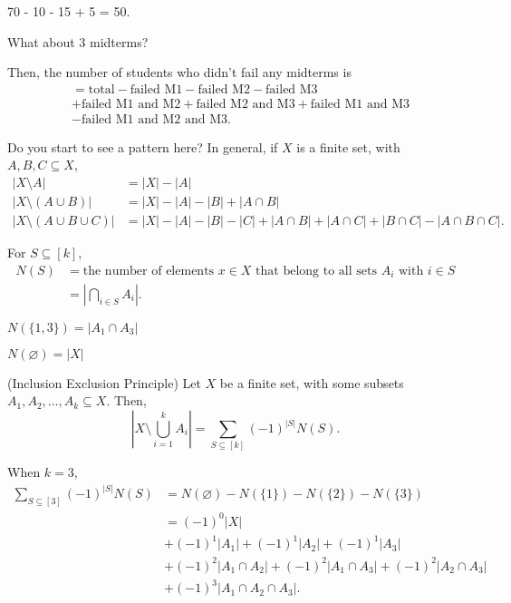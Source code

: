 70 - 10 - 15 + 5 = 50.

\begin{eg}
	What about 3 midterms?
\end{eg}

Then, the number of students who didn't fail any midterms is 
\begin{align*}
	&= \text{total} - \text{failed M1} - \text{failed M2} - \text{failed M3} \\
	&+ \text{failed M1 and M2} + \text{failed M2 and M3} + \text{failed M1 and M3} \\
	&- \text{failed M1 and M2 and M3}
.\end{align*}

Do you start to see a pattern here? In general, if \( X \) is a finite set, with \( A,B,C \subseteq X \),
\begin{align*}
	|X \setminus A| &= |X| - |A| \\
	|X \setminus (A \cup B)| &= |X| - |A| - |B| + |A \cap B| \\
	|X \setminus (A \cup B \cup C)| &= |X| - |A| - |B| - |C|  + |A \cap B| + |A \cap C| + |B \cap C| - |A \cap B \cap C|
.\end{align*}

\begin{notation}
	For \( S \subseteq [k] \), 
	\begin{align*}
		N(S) &= \text{the number of elements } x \in  X \text{ that belong to all sets } A_i \text{ with } i \in S \\
									&= \left| \bigcap_{i \in S} A_{i} \right| 
	.\end{align*}
\end{notation}

\begin{eg}
	\( N(\{1,3\}  ) = |A_{1} \cap A_3|\)
\end{eg}

\begin{eg}
	\( N(\varnothing) = |X| \)
\end{eg}

\begin{theorem}
	(Inclusion Exclusion Principle) Let \( X \) be a finite set, with some subsets \( A_{1},A_{2},\ldots ,A_k \subseteq X \). Then, \[
		\left|X \setminus \bigcup_{i=1}^{k} A_{i}\right| = \sum_{S \subseteq [k] } (-1)^{|S|} N(S)
	.\] 
\end{theorem}

\begin{eg}
	When \( k=3 \),  
	\begin{align*}
		\sum_{S \subseteq [3] } (-1)^{|S|} N(S) &= N(\varnothing) - N(\{1\} ) - N(\{2\} ) - N(\{3\} ) \\
																																				&= (-1)^0|X| \\
																																				&+ (-1)^1|A_{1}| + (-1)^1|A_{2}| + (-1)^1|A_{3}| \\
																																				&+ (-1)^2|A_{1} \cap A_2| + (-1)^2|A_{1} \cap A_3| + (-1)^2|A_{2} \cap A_3| \\
																																				&+ (-1)^3|A_{1} \cap A_2 \cap A_3|
	.\end{align*}
\end{eg}
